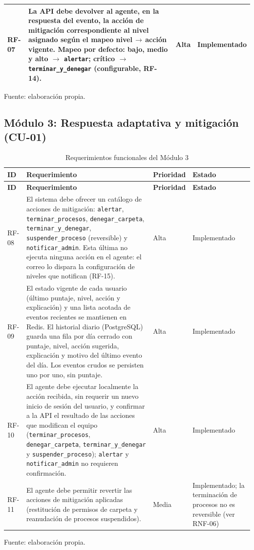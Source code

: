 \begin{tablacompacta}
\begin{longtable}{P{1.1cm}P{9.3cm}C{1.6cm}P{2.6cm}}
	\hline
	RF-07 & La API debe devolver al agente, en la respuesta del evento, la acción de mitigación correspondiente al nivel asignado según el mapeo nivel\,$\rightarrow$\,acción vigente. Mapeo por defecto: bajo, medio y alto $\rightarrow$ \texttt{alertar}; crítico $\rightarrow$ \texttt{terminar\_y\_denegar} (configurable, RF-14). & Alta & Implementado \\
	\hline
\end{longtable}
{\small Fuente: elaboración propia.\par}
\end{tablacompacta}

\subsection{Módulo 3: Respuesta adaptativa y mitigación (CU-01)}
\begin{tablacompacta}
\begin{longtable}{P{1.1cm}P{9.3cm}C{1.6cm}P{2.6cm}}
	\caption{Requerimientos funcionales del Módulo 3}
	\label{tab:rf-modulo3}\\
	\hline
	\textbf{ID} & \textbf{Requerimiento} & \textbf{Prioridad} & \textbf{Estado} \\
	\hline
	\endfirsthead
	\hline
	\textbf{ID} & \textbf{Requerimiento} & \textbf{Prioridad} & \textbf{Estado} \\
	\hline
	\endhead
	RF-08 & El sistema debe ofrecer un catálogo de acciones de mitigación: \texttt{alertar}, \texttt{terminar\_procesos}, \texttt{denegar\_carpeta}, \texttt{terminar\_y\_denegar}, \texttt{suspender\_proceso} (reversible) y \texttt{notificar\_admin}. Esta última no ejecuta ninguna acción en el agente: el correo lo dispara la configuración de niveles que notifican (RF-15). & Alta & Implementado \\
	\hline
	RF-09 & El estado vigente de cada usuario (último puntaje, nivel, acción y explicación) y una lista acotada de eventos recientes se mantienen en Redis. El historial diario (PostgreSQL) guarda una fila por día cerrado con puntaje, nivel, acción sugerida, explicación y motivo del último evento del día. Los eventos crudos se persisten uno por uno, sin puntaje. & Alta & Implementado \\
	\hline
	RF-10 & El agente debe ejecutar localmente la acción recibida, sin requerir un nuevo inicio de sesión del usuario, y confirmar a la API el resultado de las acciones que modifican el equipo (\texttt{terminar\_procesos}, \texttt{denegar\_carpeta}, \texttt{terminar\_y\_denegar} y \texttt{suspender\_proceso}); \texttt{alertar} y \texttt{notificar\_admin} no requieren confirmación. & Alta & Implementado \\
	\hline
	RF-11 & El agente debe permitir revertir las acciones de mitigación aplicadas (restitución de permisos de carpeta y reanudación de procesos suspendidos). & Media & Implementado; la terminación de procesos no es reversible (ver RNF-06) \\
	\hline
\end{longtable}
{\small Fuente: elaboración propia.\par}
\end{tablacompacta}

